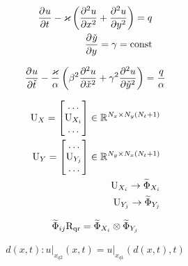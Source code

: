 \begin{align}
    \deriv{u}{t} - \varkappa \left(\deriv[2]{u}{x} + \deriv[2]{u}{y} \right) = q \\
    \deriv{\check{y}}{y} = \gamma = \text{const}
\end{align}

\begin{equation}
    \deriv{u}{\check{t}} - \frac{\varkappa }{\alpha} \left(
        \beta^2 \deriv[2]{u}{\check{x}} + \gamma^2 \deriv[2]{u}{\check{y}}
        \right) = \frac{q}{\alpha}
\end{equation}

\begin{align}
    \matr{U}_{X} = \begin{bmatrix}
        \dots \\
        \matr{U}_{X_i}\\
         \dots
    \end{bmatrix}
    \in \mathbb{R}^{N_x \times N_y (N_{t}+1)} \\
    \matr{U}_{Y} = \begin{bmatrix}
        \dots \\
        \matr{U}_{Y_j}\\
         \dots
    \end{bmatrix}
    \in \mathbb{R}^{N_y \times N_x (N_{t}+1)} \\
    \matr{U}_{X_i} \rightarrow \widetilde{\Phi}_{X_i} \\
    \matr{U}_{Y_j} \rightarrow \widetilde{\Phi}_{Y_j}
\end{align}

\begin{align}
    \widetilde{\Phi}_{ij} \matr{R}_\text{qr}
    = \widetilde{\Phi}_{X_i} \otimes \widetilde{\Phi}_{Y_j} \\
\end{align}

\begin{align}
    d(x,t) : \left. u \right\vert_{x_{q2}}(x,t) = \left. u \right\vert_{x_{q1}}(d(x,t),t)
\end{align}
